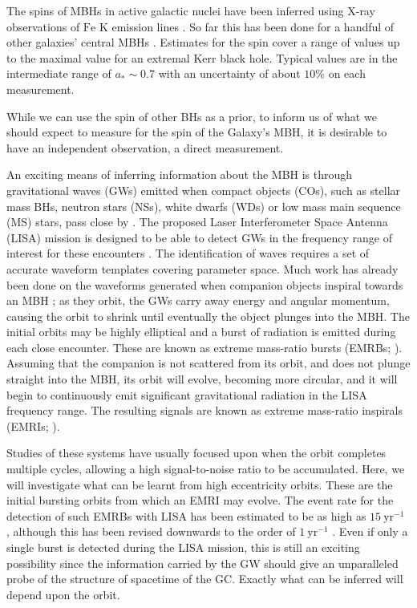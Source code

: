 \documentclass[useAMS,usedcolumn,usegraphicx,usenatbib]{mn2e}
\newcommand{\units}[1]{\ensuremath{~\mathrm{#1}}}
\begin{document}
The spins of MBHs in active galactic nuclei have been inferred using X-ray observations of $\mathrm{Fe}$ $\mathrm{K}$ emission lines \citep{Miller2007, McClintock2011}. So far this has been done for a handful of other galaxies' central MBHs \citep{Brenneman2006, Miniutti2009, Schmoll2009, delaCallePerez2010, Zoghbi2010, Nardini2011,  Patrick2011}. Estimates for the spin cover a range of values up to the maximal value for an extremal Kerr black hole. Typical values are in the intermediate range of $a_\ast \sim 0.7$ with an uncertainty of about $10\%$ on each measurement.

While we can use the spin of other BHs as a prior, to inform us of what we should expect to measure for the spin of the Galaxy's MBH, it is desirable to have an independent observation, a direct measurement.

An exciting means of inferring information about the MBH is through gravitational waves (GWs) emitted when compact objects (COs), such as stellar mass BHs, neutron stars (NSs), white dwarfs (WDs) or low mass main sequence (MS) stars, pass close by \citep{Sathyaprakash2009}. The proposed Laser Interferometer Space Antenna (LISA) mission is designed to be able to detect GWs in the frequency range of interest for these encounters \citep{Bender1998, Danzmann2003}. The identification of waves requires a set of accurate waveform templates covering parameter space. Much work has already been done on the waveforms generated when companion objects inspiral towards an MBH \citep{Glampedakis2005}; as they orbit, the GWs carry away energy and angular momentum, causing the orbit to shrink until eventually the object plunges into the MBH. The initial orbits may be highly elliptical and a burst of radiation is emitted during each close encounter. These are known as extreme mass-ratio bursts (EMRBs; \citealt{Rubbo2006}). Assuming that the companion is not scattered from its orbit, and does not plunge straight into the MBH, its orbit will evolve, becoming more circular, and it will begin to continuously emit significant gravitational radiation in the LISA frequency range. The resulting signals are known as extreme mass-ratio inspirals (EMRIs; \citealt{Amaro-Seoane2007}).

Studies of these systems have usually focused upon when the orbit completes multiple cycles, allowing a high signal-to-noise ratio to be accumulated. Here, we will investigate what can be learnt from high eccentricity orbits. These are the initial bursting orbits from which an EMRI may evolve. The event rate for the detection of such EMRBs with LISA has been estimated to be as high as $15\units{yr^{-1}}$ \citep*{Rubbo2006}, although this has been revised downwards to the order of $1\units{yr^{-1}}$ \citep*{Hopman2007}. Even if only a single burst is detected during the LISA mission, this is still an exciting possibility since the information carried by the GW should give an unparalleled probe of the structure of spacetime of the GC. Exactly what can be inferred will depend upon the orbit.
\end{document}

